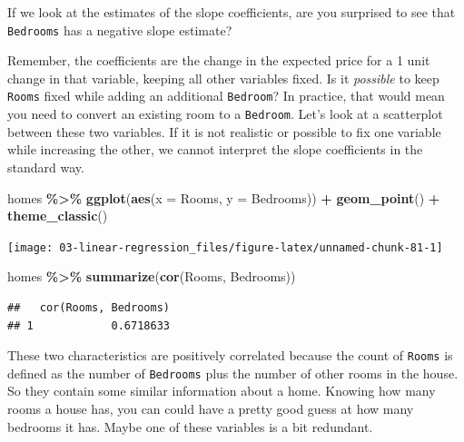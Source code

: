 \documentclass[
]{book}
\newenvironment{Shaded}{\begin{snugshade}}{\end{snugshade}}
\newcommand{\AttributeTok}[1]{\textcolor[rgb]{0.13,0.29,0.53}{#1}}
\newcommand{\FunctionTok}[1]{\textcolor[rgb]{0.13,0.29,0.53}{\textbf{#1}}}
\newcommand{\NormalTok}[1]{#1}
\newcommand{\SpecialCharTok}[1]{\textcolor[rgb]{0.81,0.36,0.00}{\textbf{#1}}}
\begin{document}
If we look at the estimates of the slope coefficients, are you surprised to see that \texttt{Bedrooms} has a negative slope estimate?

Remember, the coefficients are the change in the expected price for a 1 unit change in that variable, keeping all other variables fixed. Is it \emph{possible} to keep \texttt{Rooms} fixed while adding an additional \texttt{Bedroom}? In practice, that would mean you need to convert an existing room to a \texttt{Bedroom}. Let's look at a scatterplot between these two variables. If it is not realistic or possible to fix one variable while increasing the other, we cannot interpret the slope coefficients in the standard way.

\begin{Shaded}
\begin{Highlighting}[]
\NormalTok{homes }\SpecialCharTok{\%\textgreater{}\%}
  \FunctionTok{ggplot}\NormalTok{(}\FunctionTok{aes}\NormalTok{(}\AttributeTok{x =}\NormalTok{ Rooms, }\AttributeTok{y =}\NormalTok{ Bedrooms)) }\SpecialCharTok{+} 
  \FunctionTok{geom\_point}\NormalTok{() }\SpecialCharTok{+}
  \FunctionTok{theme\_classic}\NormalTok{()}
\end{Highlighting}
\end{Shaded}

\begin{center}\texttt{[image: 03-linear-regression\_files/figure-latex/unnamed-chunk-81-1]} \end{center}

\begin{Shaded}
\begin{Highlighting}[]
\NormalTok{homes }\SpecialCharTok{\%\textgreater{}\%}
  \FunctionTok{summarize}\NormalTok{(}\FunctionTok{cor}\NormalTok{(Rooms, Bedrooms))}
\end{Highlighting}
\end{Shaded}

\begin{verbatim}
##   cor(Rooms, Bedrooms)
## 1            0.6718633
\end{verbatim}

These two characteristics are positively correlated because the count of \texttt{Rooms} is defined as the number of \texttt{Bedrooms} plus the number of other rooms in the house. So they contain some similar information about a home. Knowing how many rooms a house has, you can could have a pretty good guess at how many bedrooms it has. Maybe one of these variables is a bit redundant.
\end{document}
